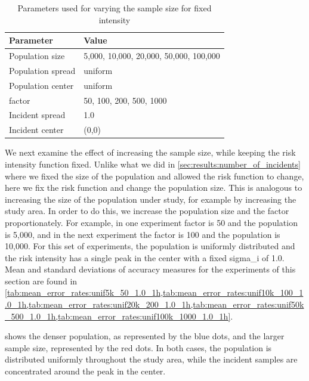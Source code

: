 \begin{table}[htbp]
    \centering
    \begin{tabular}{ll}
        \toprule
        Parameter & Value \\
        \midrule
        Population size & 5,000, 10,000, 20,000, 50,000, 100,000 \\
        Population \gls{spread} & uniform \\
        Population center & uniform \\
        \Gls{factor} & 50, 100, 200, 500, 1000 \\
        Incident \gls{spread} & 1.0 \\
        Incident center & (0,0) \\
        \bottomrule
    \end{tabular}
    \caption{Parameters used for varying the sample size for fixed intensity}
    \label{tab:params:unifNpop_1h}
\end{table}

We next examine the effect of increasing the sample size, while keeping the risk intensity function fixed.
Unlike what we did in \cref{sec:results:number_of_incidents} where we fixed the size of the population and allowed the risk function to change,
here we fix the risk function and change the population size.
This is analogous to increasing the size of the population under study, for example by increasing the study area.
In order to do this, we increase the population size and the \gls{factor} proportionately.
For example, in one experiment \gls{factor} is 50 and the population is 5,000,
and in the next experiment the \gls{factor} is 100 and the population is 10,000.
For this set of experiments, the population is uniformly distributed and the risk intensity has a single peak in the center with a fixed \gls{sigma_i} of 1.0.
Mean and standard deviations of accuracy measures for the experiments of this section are found in \cref{tab:mean_error_rates:unif5k_50_1.0_1h,tab:mean_error_rates:unif10k_100_1.0_1h,tab:mean_error_rates:unif20k_200_1.0_1h,tab:mean_error_rates:unif50k_500_1.0_1h,tab:mean_error_rates:unif100k_1000_1.0_1h}.

 shows the denser population, as represented by the blue dots, and the larger sample size, represented by the red dots.
In both cases, the population is distributed uniformly throughout the study area,
while the incident samples are concentrated around the peak in the center.

